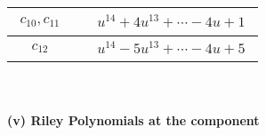 \documentclass[1p]{elsarticle_modified}
\theoremstyle{definition}
\begin{document}
\begin{tabular}{m{50pt}|m{274pt}}
\hline $$\begin{aligned}c_{10},c_{11}\end{aligned}$$&$\begin{aligned}
&u^{14}+4 u^{13}+\cdots-4 u+1
\end{aligned}$\\
\hline $$\begin{aligned}c_{12}\end{aligned}$$&$\begin{aligned}
&u^{14}-5 u^{13}+\cdots-4 u+5
\end{aligned}$\\
\hline
\end{tabular}\\~\\
\newpage\renewcommand{\arraystretch}{1}
\flushleft \textbf{(v) Riley Polynomials at the component}\newline \\
\end{document}
